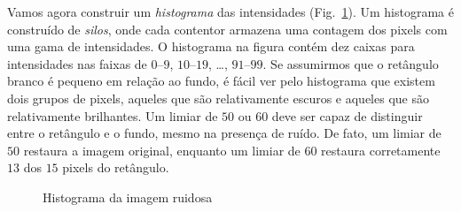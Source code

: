 
Vamos agora construir um \emph{histograma} das intensidades (Fig.~\ref{fig.hist}). Um histograma é construído de \emph{silos}, onde cada contentor armazena uma contagem dos pixels com uma gama de intensidades. O histograma na figura contém dez caixas para intensidades nas faixas de $0$--$9$, $10$--$19$, \ldots, $91$--$99$. Se assumirmos que o retângulo branco é pequeno em relação ao fundo, é fácil ver pelo histograma que existem dois grupos de pixels, aqueles que são relativamente escuros e aqueles que são relativamente brilhantes. Um limiar de $50$ ou $60$ deve ser capaz de distinguir entre o retângulo e o fundo, mesmo na presença de ruído. De fato, um limiar de $50$ restaura a imagem original, enquanto um limiar de $60$ restaura corretamente $13$ dos $15$ pixels do retângulo.

\begin{figure}
\begin{center}
\caption{Histograma da imagem ruidosa}\label{fig.hist}
\end{center}
\end{figure}

